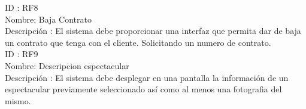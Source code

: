ID : RF8 \\
Nombre: Baja Contrato \\
Descripción :  El sistema debe proporcionar una interfaz que permita dar de baja un contrato que tenga con el cliente. Solicitando un numero de contrato. \\

ID : RF9 \\
Nombre: Descripcion espectacular \\
Descripción :  El sistema debe desplegar en una pantalla la información de un espectacular previamente seleccionado así como al menos una fotografia del mismo. \\



